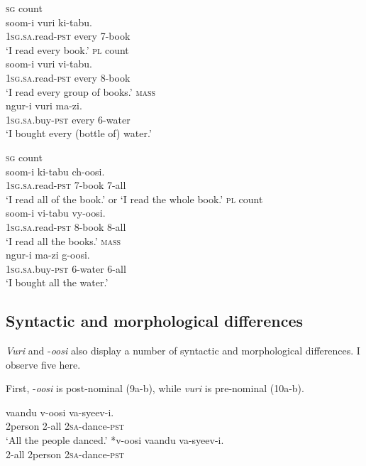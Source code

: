 \documentclass[output=paper]{langsci/langscibook}
\begin{document}
\ea\label{ex:landman:7}
\ea\label{ex:landman:7a}
\textsc{sg} count\\
\gll soom-i      vuri    ki-tabu.    \\
     1\textsc{sg.sa}.read-\textsc{pst}  every    7-book  \\
\glt ‘I read every book.’
\ex\label{ex:landman:7b}
\textsc{pl} count\\
\gll soom-i      vuri    vi-tabu.    \\
     1\textsc{sg.sa}.read-\textsc{pst}  every    8-book\\
\glt ‘I read every group of books.’
\ex\label{ex:landman:7c}
\textsc{mass}\\
\gll ngur-i      vuri    ma-zi.    \\
     1\textsc{sg.sa}.buy-\textsc{pst}    every    6-water\\
\glt ‘I bought every (bottle of) water.’
\z
\z

\ea\label{ex:landman:8}
\ea\label{ex:landman:8a}
\textsc{sg} count\\
\gll soom-i      ki-tabu  ch-oosi.    \\
     1\textsc{sg.sa}.read-\textsc{pst}  7-book  7-all\\
\glt ‘I read all of the book.’ or ‘I read the whole book.’
\ex\label{ex:landman:8b}
\textsc{pl} count\\
\gll soom-i      vi-tabu  vy-oosi.  \\
     1\textsc{sg.sa}.read-\textsc{pst}  8-book  8-all\\
\glt ‘I read all the books.’
\ex\label{ex:landman:8c}
\textsc{mass}\\
\gll ngur-i      ma-zi    g-oosi.  \\
     1\textsc{sg.sa}.buy-\textsc{pst}    6-water  6-all\\
\glt ‘I bought all the water.’
\z
\z

\subsection{Syntactic and morphological differences}

\textit{Vuri} and -\textit{oosi} also display a number of syntactic and morphological differences. I observe five here.

First, -\textit{oosi} is post-nominal (9a-b), while \textit{vuri} is pre-nominal (10a-b). 

\ea\label{ex:landman:9}
\ea
\gll vaandu    v-oosi    va-syeev-i.    \\
     2person    2-all    2\textsc{sa}-dance-\textsc{pst}       \\
\glt ‘All the people danced.’
\ex\label{ex:landman:9b}
\gll \textup{*}v-oosi    vaandu  va-syeev-i.  \\
     2-all    2person  2\textsc{sa}-dance-\textsc{pst}  \\
\z
\z
\end{document}
